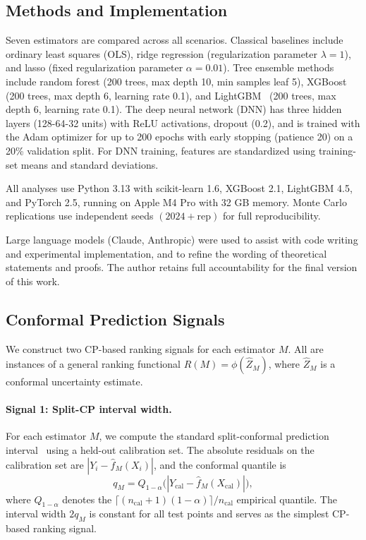\documentclass[pdflatex,sn-mathphys-ay]{sn-jnl}%
\theoremstyle{thmstyleone}%
\theoremstyle{thmstyletwo}%
\theoremstyle{thmstylethree}%
\begin{document}
\subsection{Methods and Implementation}
\label{sec:methods}

Seven estimators are compared across all scenarios. Classical baselines include ordinary least squares (OLS), ridge regression (regularization parameter $\lambda = 1$), and lasso (fixed regularization parameter $\alpha = 0.01$). Tree ensemble methods include random forest (200 trees, max depth 10, min samples leaf 5), XGBoost~\citep{chen2016} (200 trees, max depth 6, learning rate 0.1), and LightGBM~\citep{ke2017} (200 trees, max depth 6, learning rate 0.1). The deep neural network (DNN) has three hidden layers (128-64-32 units) with ReLU activations, dropout (0.2), and is trained with the Adam optimizer for up to 200 epochs with early stopping (patience 20) on a 20\% validation split. For DNN training, features are standardized using training-set means and standard deviations.

All analyses use Python 3.13 with scikit-learn 1.6, XGBoost 2.1, LightGBM 4.5, and PyTorch 2.5, running on Apple M4 Pro with 32 GB memory. Monte Carlo replications use independent seeds $(2024 + \text{rep})$ for full reproducibility.

Large language models (Claude, Anthropic) were used to assist with code writing and experimental implementation, and to refine the wording of theoretical statements and proofs. The author retains full accountability for the final version of this work.

\subsection{Conformal Prediction Signals}
\label{sec:cp-signals}

We construct two CP-based ranking signals for each estimator $M$. All are instances of a general ranking functional $R(M) = \phi(\hat{Z}_M)$, where $\hat{Z}_M$ is a conformal uncertainty estimate.

\paragraph{Signal 1: Split-CP interval width.} For each estimator $M$, we compute the standard split-conformal prediction interval~\citep{lei2018, angelopoulos2023} using a held-out calibration set. The absolute residuals on the calibration set are $|Y_i - \hat{f}_M(X_i)|$, and the conformal quantile is
\begin{equation}
    q_M = Q_{1-\alpha}\bigl(|Y_{\text{cal}} - \hat{f}_M(X_{\text{cal}})|\bigr),
\end{equation}
where $Q_{1-\alpha}$ denotes the $\lceil (n_{\text{cal}}+1)(1-\alpha)\rceil / n_{\text{cal}}$ empirical quantile. The interval width $2q_M$ is constant for all test points and serves as the simplest CP-based ranking signal.
\end{document}
